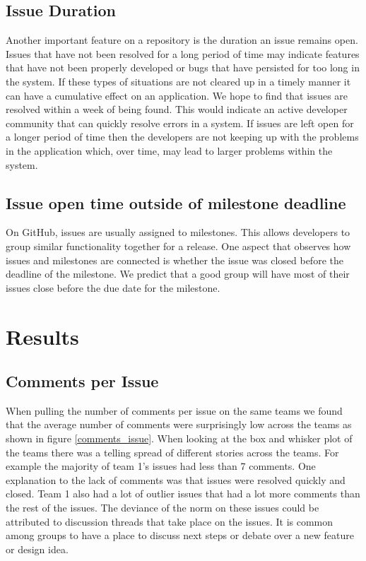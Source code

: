\documentclass[conference]{IEEEtran}
\begin{document}
\subsection{Issue Duration}
Another important feature on a repository is the duration an issue remains open. Issues that have not been resolved for a long period of time may indicate features that have not been properly developed or bugs that have persisted for too long in the system. If these types of situations are not cleared up in a timely manner it can have a cumulative effect on an application. We hope to find that issues are resolved within a week of being found. This would indicate an active developer community that can quickly resolve errors in a system. If issues are left open for a longer period of time then the developers are not keeping up with the problems in the application which, over time, may lead to larger problems within the system. 

\subsection{Issue open time outside of milestone deadline}
On GitHub, issues are usually assigned to milestones. This allows developers to group similar functionality together for a release. One aspect that observes how issues and milestones are connected is whether the issue was closed before the deadline of the milestone. We predict that a good group will have most of their issues close before the due date for the milestone. 






\section{Results}
\subsection{Comments per Issue}
When pulling the number of comments per issue on the same teams we found that the average number of comments were surprisingly low across the teams as shown in figure \ref{comments_issue}. When looking at the box and whisker plot of the teams there was a telling spread of different stories across the teams. For example the majority of team 1's issues had less than 7 comments. One explanation to the lack of comments was that issues were resolved quickly and closed. Team 1 also had a lot of outlier issues that had a lot more comments than the rest of the issues. The deviance of the norm on these issues could be attributed to discussion threads that take place on the issues. It is common among groups to have a place to discuss next steps or debate over a new feature or design idea.
\end{document}
